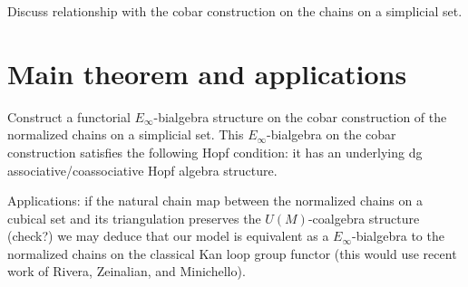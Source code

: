 \documentclass{amsart}
\begin{document}
Discuss relationship with the cobar construction on the chains on a simplicial set. 

\section{Main theorem and applications}

Construct a functorial $E_{\infty}$-bialgebra structure on the cobar construction of the normalized chains on a simplicial set. This $E_{\infty}$-bialgebra on the cobar construction satisfies the following Hopf condition: it has an underlying dg associative/coassociative Hopf algebra structure. 

Applications: if the natural chain map between the normalized chains on a cubical set and its triangulation preserves the $U(M)$-coalgebra structure (check?) we may deduce that our model is equivalent as a $E_{\infty}$-bialgebra to the normalized chains on the classical Kan loop group functor (this would use recent work of Rivera, Zeinalian, and Minichello). 


\end{document}
